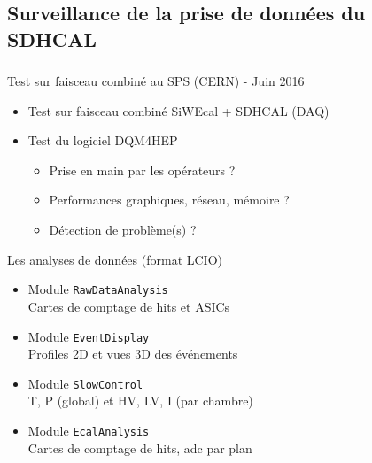\documentclass[8pt]{beamer}
\begin{document}
    \subsection{Surveillance de la prise de données du SDHCAL}

    \begin{frame}
    \frametitle{\secname}
    \framesubtitle{\subsecname}
      \begin{block}{Test sur faisceau combiné au SPS (CERN) - Juin 2016}
        \begin{itemize}
          \item Test sur faisceau combiné SiWEcal + SDHCAL (DAQ)
          \item Test du logiciel DQM4HEP
          \begin{itemize}
            \item Prise en main par les opérateurs ?
            \item Performances graphiques, réseau, mémoire ?
            \item Détection de problème(s) ?
          \end{itemize}
        \end{itemize}
      \end{block}
      \pause
      \begin{block}{Les analyses de données (format LCIO)}
        \begin{minipage}{0.49\linewidth}
          \begin{itemize}
            \item Module \texttt{RawDataAnalysis} \\
            Cartes de comptage de hits et ASICs
            \item Module \texttt{EventDisplay} \\
            Profiles 2D et vues 3D des événements
          \end{itemize}
        \end{minipage} \hfill
        \begin{minipage}{0.49\linewidth}
          \begin{itemize}
            \item Module \texttt{SlowControl} \\
            T, P (global) et HV, LV, I (par chambre)
            \item Module \texttt{EcalAnalysis} \\
            Cartes de comptage de hits, adc par plan
          \end{itemize}

\end{minipage}
\end{block}
\end{frame}
\end{document}
